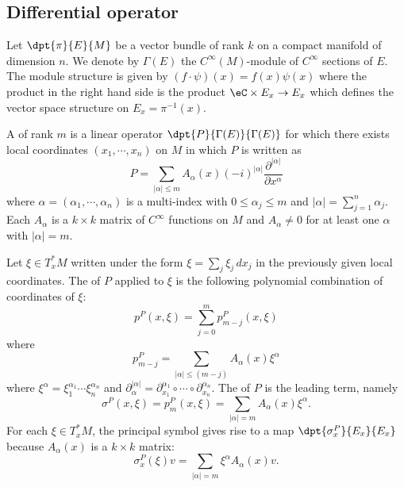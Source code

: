 \subsection{Differential operator}

Let $\dpt{ \pi }{ E }{ M }$ be a vector bundle of rank $k$ on a compact manifold of dimension $n$. We denote by $\Gamma(E)$ the $ C^{\infty}(M)$-module of $ C^{\infty}$ sections of $E$. The module structure is given by $(f\cdot\psi)(x)=f(x)\psi(x)$ where the product in the right hand side is the product $\eC\times E_x\to E_x$ which defines the vector space structure on $E_x=\pi^{-1}(x)$.

A  of rank $m$  is a linear operator $\dpt{ P }{ \Gamma(E) }{ \Gamma(E) }$ for which there exists local coordinates $(x_1,\cdots,x_n)$ on $M$ in which $P$ is written as
\begin{equation}
P=\sum_{| \alpha |\leq m}A_{\alpha}(x)(-i)^{| \alpha |}\frac{ \partial^{| \alpha |} }{ \partial x^{\alpha} }
\end{equation}
where $\alpha=(\alpha_1,\cdots,\alpha_n)$ is a multi-index with $0\leq\alpha_j\leq m$ and $| \alpha |=\sum_{j=1}^n\alpha_j$. Each $A_{\alpha}$ is a $k\times k$ matrix of $ C^{\infty}$ functions on $M$ and $A_{\alpha}\neq 0$ for at least one $\alpha$ with $| \alpha |=m$.

Let $\xi\in T^*_xM$ written under the form $\xi=\sum_j\xi_j\,dx_j$ in the previously given local coordinates. The  of $P$ applied to $\xi$ is the following polynomial combination of coordinates of $\xi$:
\begin{equation}
p^P(x,\xi)=\sum_{j=0}^m p^P_{m-j}(x,\xi)
\end{equation}
where
\[ 
  p^P_{m-j}=\sum_{| \alpha |\leq(m-j)}A_{\alpha}(x)\xi^{\alpha}
\]
where $\xi^{\alpha}=\xi_1^{\alpha_1}\cdots\xi_n^{\alpha_n}$ and $\partial^{| \alpha |}_{\alpha}=\partial_{x_1}^{\alpha_1}\circ\cdots\circ\partial^{\alpha_n}_{x_n}$.  The  of $P$ is the leading term, namely
\begin{equation}
\sigma^P(x,\xi)=p^P_m(x,\xi)=\sum_{| \alpha |=m}A_{\alpha}(x)\xi^{\alpha}.
\end{equation}
For each $\xi\in T^*_xM$, the principal symbol gives rise to a map $\dpt{ \sigma_x^P }{ E_x }{ E_x }$ because $A_{\alpha}(x)$ is a $k\times k$ matrix:
\[ 
  \sigma_x^P(\xi)v=\sum_{| \alpha |=m}\xi^{\alpha}A_{\alpha}(x)v.
\]

